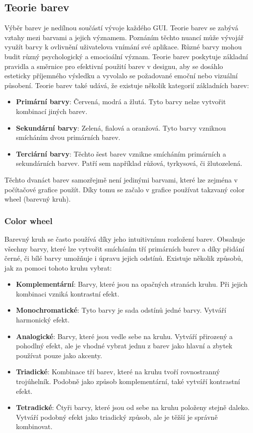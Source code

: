 \subsection{Teorie barev}
Výběr barev je nedílnou součástí vývoje každého GUI. Teorie barev se zabývá vztahy mezi barvami a jejich významem. Poznáním těchto nuancí může vývojář využít barvy k ovlivnění uživatelova vnímání své aplikace. Různé barvy mohou budit různý psychologický a emocioální význam. Teorie barev poskytuje základní pravidla a směrnice pro efektivní použití barev v designu, aby se dosáhlo esteticky příjemného výsledku a vyvolalo se požadované emoční nebo vizuální působení. Teorie barev také udává, že existuje několik kategorií základních barev:
\begin{itemize}
    \item \textbf{Primární barvy}: Červená, modrá a žlutá. Tyto barvy nelze vytvořit kombinací jiných barev.
    \item \textbf{Sekundární barvy}: Zelená, fialová a oranžová. Tyto barvy vzniknou smícháním dvou primárních barev.
    \item \textbf{Terciární barvy}: Těchto šest barev vznikne smícháním primárních a sekundárních barvev. Patří sem například růžová, tyrkysová, či žlutozelená.
\end{itemize}

Těchto dvanáct barev samozřejmě není jedinými barvami, které lze zejména v počítačové grafice použít. Díky tomu se začalo v grafice používat takzvaný color wheel (barevný kruh).\cite{color_theory_design}

\subsubsection{Color wheel}
Barevný kruh se často používá díky jeho intuitivnímu rozložení barev. Obsahuje všechny barvy, které lze vytvořit smícháním tří primárních barev a díky přidání černé, či bílé barvy umožňuje i úpravu jejich odstínů. Existuje několik způsobů, jak za pomoci tohoto kruhu vybrat:
\begin{itemize}
    \item \textbf{Komplementární}: Barvy, které jsou na opačných stranách kruhu. Při jejich kombinaci vzniká kontrastní efekt.
    \item \textbf{Monochromatické}: Tyto barvy je sada odstínů jedné barvy. Vytváří harmonický efekt.
    \item \textbf{Analogické}: Barvy, které jsou vedle sebe na kruhu. Vytváří přirozený a pohodlný efekt, ale je vhodné vybrat jednu z barev jako hlavní a zbytek používat pouze jako akcenty.
    \item \textbf{Triadické}: Kombinace tří barev, které na kruhu tvoří rovnostranný trojúhelník. Podobně jako způsob komplementární, také vytváří kontrastní efekt.
    \item \textbf{Tetradické}: Čtyři barvy, které jsou od sebe na kruhu položeny stejně daleko. Vytváří podobný efekt jako triadický způsob, ale je těžší je správně kombinovat.
\end{itemize}\cite{color_wheel}

